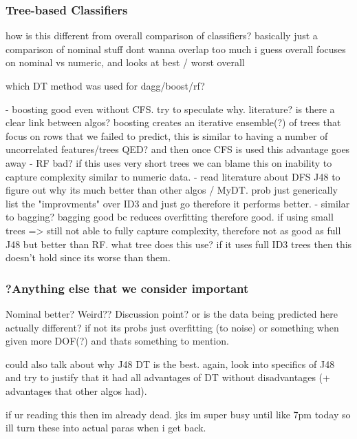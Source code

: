 \subsubsection{Tree-based Classifiers}


how is this different from overall comparison of classifiers? basically just a comparison of nominal stuff
dont wanna overlap too much
i guess overall focuses on nominal vs numeric, and looks at best / worst overall

which DT method was used for dagg/boost/rf?


- boosting good even without CFS. try to speculate why. literature? is there a clear link between algos? boosting creates an iterative ensemble(?) of trees that focus on rows that we failed to predict, this is similar to having a number of uncorrelated features/trees QED? and then once CFS is used this advantage goes away
- RF bad? if this uses very short trees we can blame this on inability to capture complexity similar to numeric data.
- read literature about DFS J48 to figure out why its much better than other algos / MyDT. prob just generically list the "improvments" over ID3 and just go therefore it performs better.
- similar to bagging? bagging good bc reduces overfitting therefore good. if using small trees => still not able to fully capture complexity, therefore not as good as full J48 but better than RF. what tree does this use? if it uses full ID3 trees then this doesn't hold since its worse than them.


\subsubsection{?Anything else that we consider important}

Nominal better? Weird?? Discussion point?
or is the data being predicted here actually different? if not its probs just overfitting (to noise) or something when given more DOF(?) and thats something to mention.


could also talk about why J48 DT is the best. again, look into specifics of J48 and try to justify that it had all advantages of DT without disadvantages (+ advantages that other algos had).


if ur reading this then im already dead. jks im super busy until like 7pm today so ill turn these into actual paras when i get back.
